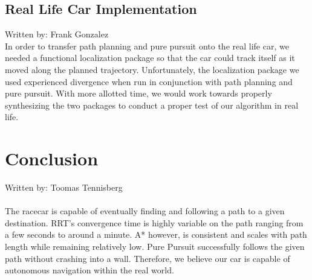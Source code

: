 \documentclass{article}
\begin{document}

\subsection{Real Life Car Implementation}
Written by: Frank Gonzalez\\ 

In order to transfer path planning and pure pursuit onto the real life car, we needed a functional localization package so that the car could track itself as it moved along the planned trajectory. Unfortunately, the localization package we used experienced divergence when run in conjunction with path planning and pure pursuit. With more allotted time, we would work towards properly synthesizing the two packages to conduct a proper test of our algorithm in real life.

\section{Conclusion}
Written by: Toomas Tennisberg\\\\
The racecar is capable of eventually finding and following a path to a given destination. RRT's convergence time is highly variable on the path ranging from a few seconds to around a minute. A* however, is consistent and scales with path length while remaining relatively low. Pure Pursuit successfully follows the given path without crashing into a wall. Therefore, we believe our car is capable of autonomous navigation within the real world.\\
\pagebreak
\end{document}
